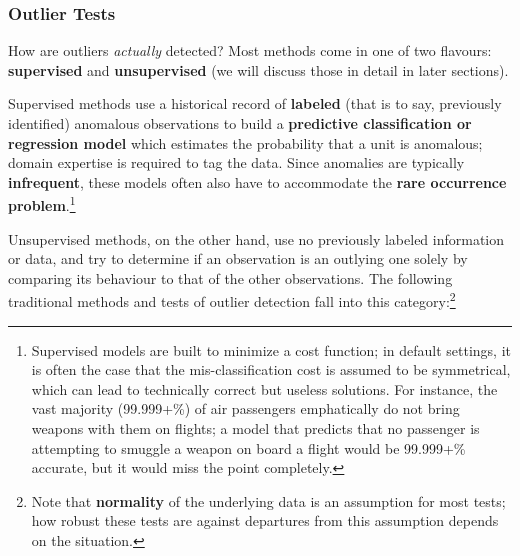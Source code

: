 \subsubsection*{Outlier Tests} How are outliers \textit{actually} detected? Most methods come in one of two flavours: \textbf{supervised} and \textbf{unsupervised} (we will discuss those in detail in later sections).\par
Supervised methods use a historical record of \textbf{labeled} (that is to say, previously identified) anomalous observations to build a \textbf{predictive classification or regression model} which estimates the probability that a unit is anomalous; domain expertise is required to tag the data. Since anomalies are typically \textbf{infrequent}, these models often also have to accommodate the \textbf{rare occurrence problem}.\footnote{Supervised models are built to minimize a cost function; in default settings, it is often the case that the mis-classification cost is assumed to be symmetrical, which can lead to technically correct but useless solutions. For instance, the vast majority (99.999+\%) of air passengers emphatically do not bring weapons with them on flights; a model that predicts that no passenger is attempting to smuggle a weapon on board a flight would be 99.999+\% accurate, but it would miss the point completely.}\par Unsupervised methods, on the other hand, use no previously labeled information or data, and try to determine if an observation is an outlying one solely by comparing its behaviour to that of the other observations. \newpage\noindent The following traditional methods and tests of outlier detection fall into this category:\footnote{Note that \textbf{normality} of the underlying data is an assumption for most tests; how robust these tests are against departures from this assumption depends on the situation.}
